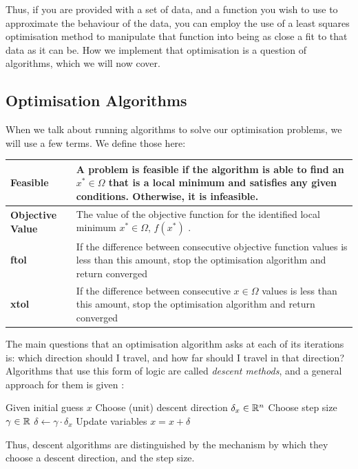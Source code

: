 Thus, if you are provided with a set of data, and a function you wish to use to approximate the behaviour of the data, you can 
employ the use of a least squares optimisation method to manipulate that function into being as close a fit to that data as 
it can be. How we implement that optimisation is a question of algorithms, which we will now cover.

\subsection{Optimisation Algorithms}

\begin{notn}
    When we talk about running algorithms to solve our optimisation problems, we will use a few terms. We define those here:    
    \begin{table}[h!]
        \begin{tabular}{p{3.5cm}|p{10cm}}
            \textbf{Feasible} & A problem is feasible if the algorithm is able to find an $x^* \in \Omega$ that is a local minimum and satisfies any given conditions. Otherwise, it is \textbf{infeasible}. \\ \hline
            \textbf{Objective Value} & The value of the objective function for the identified local minimum $x^* \in \Omega$, $f(x^*)$ . \\ \hline
            \textbf{ftol} & If the difference between consecutive objective function values is less than this amount, stop the optimisation algorithm and return converged \\ \hline
            \textbf{xtol} & If the difference between consecutive $x \in \Omega$ values is less than this amount, stop the optimisation algorithm and return converged \\ \hline
        \end{tabular}
    \end{table}
    
\end{notn}

The main questions that an optimisation algorithm asks at each of its iterations is: which direction should I travel, and how far 
should I travel in that direction? Algorithms that use this form of logic are called \textit{descent methods}, and a 
general approach for them is given \cite{carlone-least-squares}:

\begin{algorithm}[h!]
    \begin{algorithmic}[1]
        \State Given initial guess $x$
            \State Choose (unit) descent direction $\delta_x \in \mathbb{R}^n$
            \State Choose step size $\gamma \in \mathbb{R}$
            \State $\delta \leftarrow \gamma \cdot \delta_x$
            \State Update variables $x = x + \delta$
        \EndWhile
    \end{algorithmic}
\end{algorithm}
Thus, descent algorithms are distinguished by the mechanism by which they choose a descent direction, and the step size.

